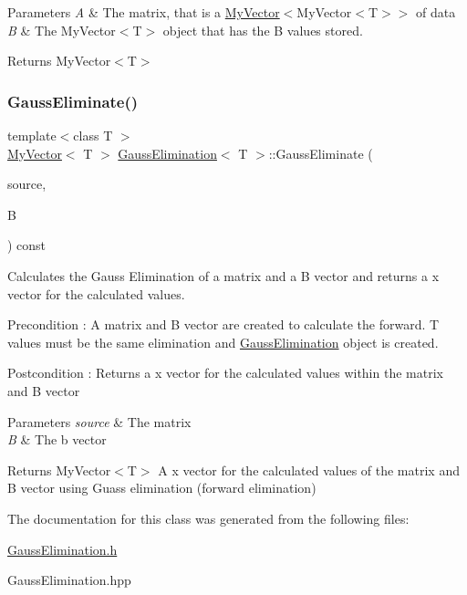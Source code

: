 \begin{DoxyParams}{Parameters}
{\em A} & The matrix, that is a \mbox{\hyperlink{class_my_vector}{My\+Vector}}$<$My\+Vector$<$\+T$>$$>$ of data \\
\hline
{\em B} & The My\+Vector$<$\+T$>$ object that has the B values stored. \\
\hline
\end{DoxyParams}
\begin{DoxyReturn}{Returns}
My\+Vector$<$\+T$>$ 
\end{DoxyReturn}
\mbox{\label{class_gauss_elimination_a393e790f3c8ab830fad14120c552326c}} 
\subsubsection{\texorpdfstring{GaussEliminate()}{GaussEliminate()}}
{\footnotesize\ttfamily template$<$class T $>$ \\
\mbox{\hyperlink{class_my_vector}{My\+Vector}}$<$ T $>$ \mbox{\hyperlink{class_gauss_elimination}{Gauss\+Elimination}}$<$ T $>$\+::Gauss\+Eliminate (\begin{DoxyParamCaption}\item[{const \mbox{\hyperlink{class_matrix}{Matrix}}$<$ T $>$ \&}]{source,  }\item[{const \mbox{\hyperlink{class_my_vector}{My\+Vector}}$<$ T $>$ \&}]{B }\end{DoxyParamCaption}) const}



Calculates the Gauss Elimination of a matrix and a B vector and returns a x vector for the calculated values. 

\begin{DoxyPrecond}{Precondition}
\+: A matrix and B vector are created to calculate the forward. T values must be the same elimination and \mbox{\hyperlink{class_gauss_elimination}{Gauss\+Elimination}} object is created. 
\end{DoxyPrecond}
\begin{DoxyPostcond}{Postcondition}
\+: Returns a x vector for the calculated values within the matrix and B vector 
\end{DoxyPostcond}

\begin{DoxyParams}{Parameters}
{\em source} & The matrix \\
\hline
{\em B} & The b vector \\
\hline
\end{DoxyParams}
\begin{DoxyReturn}{Returns}
My\+Vector$<$\+T$>$ A x vector for the calculated values of the matrix and B vector using Guass elimination (forward elimination) 
\end{DoxyReturn}


The documentation for this class was generated from the following files\+:\begin{DoxyCompactItemize}
\item 
\mbox{\hyperlink{_gauss_elimination_8h}{Gauss\+Elimination.\+h}}\item 
Gauss\+Elimination.\+hpp\end{DoxyCompactItemize}
